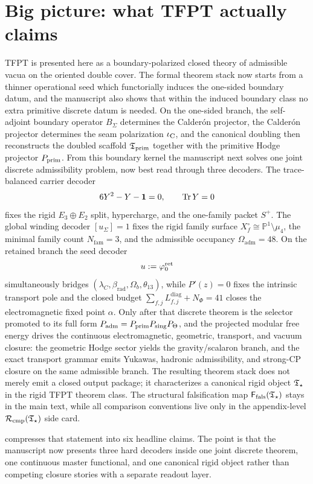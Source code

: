 \section{Big picture: what TFPT actually claims}

TFPT is presented here as a boundary-polarized closed theory of admissible vacua on the oriented
double cover. The formal theorem stack now starts from a thinner operational seed which functorially
induces the one-sided boundary datum, and the manuscript also shows that within the induced
boundary class no extra primitive discrete datum is needed. On the
one-sided branch, the self-adjoint boundary operator $B_\Sigma$ determines the Calder\'on projector,
the Calder\'on projector determines the seam polarization
$\iota_{\mathrm C}$, and the canonical doubling then reconstructs the doubled scaffold $\mathfrak T_{\mathrm{prim}}$ together with
the primitive Hodge projector $P_{\mathrm{prim}}$. From this boundary kernel the manuscript next solves one
joint discrete admissibility problem, now best read through three decoders. The trace-balanced
carrier decoder
\[
6Y^2-Y-\mathbf 1=0,
\qquad
\operatorname{Tr} Y=0
\]
fixes the rigid $E_3\oplus E_2$ split, hypercharge, and the one-family packet $S^+$. The global
winding decoder $[u_\Sigma]=1$ fixes the rigid family surface $X_f^\circ\cong\mathbb P^1\setminus
\mu_4$, the minimal family count $N_{\mathrm{fam}}=3$, and the admissible occupancy
$\Omega_{\mathrm{adm}}=48$. On the retained branch the seed decoder
\[
u:=\varphi_0^{\mathrm{ret}}
\]
simultaneously bridges $(\lambda_C,\beta_{\mathrm{rad}},\Omega_b,\theta_{13})$, while
$P'(z)=0$ fixes the intrinsic transport pole and the closed budget
$\sum_{f,j}L_{f,j}^{\mathrm{diag}}+N_\Phi=41$ closes the electromagnetic fixed point $\alpha$.
Only after that discrete theorem is the selector promoted to its full form
$P_{\mathrm{adm}}=P_{\mathrm{prim}} P_{\mathrm{sing}}P_{\Theta}$, and the projected modular free energy drives the
continuous electromagnetic, geometric, transport, and vacuum closure: the geometric Hodge sector
yields the gravity/scalaron branch, and the exact transport grammar emits Yukawas, hadronic
admissibility, and strong-CP closure on the same admissible branch. The resulting theorem stack
does not merely emit a closed output package; it characterizes a canonical rigid object $\mathfrak T_{\star}$ in
the rigid TFPT theorem class. The structural falsification map $\mathsf F_{\mathrm{fals}}(\mathfrak T_{\star})$ stays in the main
text, while all comparison conventions live only in the appendix-level $\mathcal R_{\mathrm{cmp}}(\mathfrak T_{\star})$ side card.

 compresses that statement into six headline claims. The point is
that the manuscript now presents three hard decoders inside one joint discrete theorem, one
continuous master functional, and one canonical rigid object rather than competing closure stories
with a separate readout layer.

